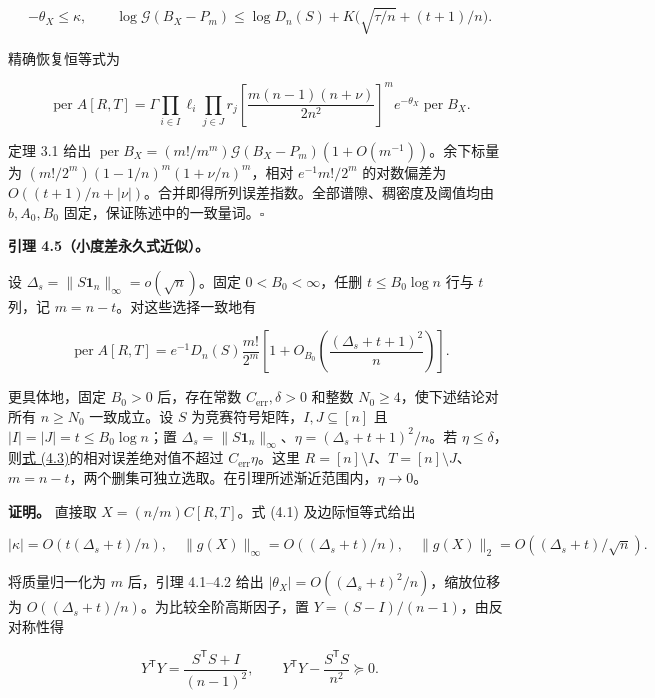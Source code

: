 \documentclass[11pt,a4paper]{article}
\begin{document}
\[
-\theta_X\le\kappa,\qquad
\log\mathcal G(B_X-P_m)\le\log D_n(S)+K\bigl(\sqrt{\tau/n}+(t+1)/n\bigr).
\]

精确恢复恒等式为

\begin{equation}
\operatorname{per}A[R,T]=\Gamma\prod_{i\in I}\ell_i\prod_{j\in J}r_j
\left[\frac{m(n-1)(n+\nu)}{2n^2}\right]^m
 e^{-\theta_X}\operatorname{per}B_X.\tag{4.2}
\label{eq-exact-restoration}
\end{equation}

定理 3.1 给出 \(\operatorname{per}B_X=(m!/m^m)\mathcal G(B_X-P_m)(1+O(m^{-1}))\)。余下标量为 \((m!/2^m)(1-1/n)^m(1+\nu/n)^m\)，相对 \(e^{-1}m!/2^m\) 的对数偏差为 \(O((t+1)/n+|\nu|)\)。合并即得所列误差指数。全部谱隙、稠密度及阈值均由 \(b,A_0,B_0\) 固定，保证陈述中的一致量词。\(\square\)

\textbf{引理 4.5（小度差永久式近似）。}

设 \(\Delta_s=\|S\mathbf 1_n\|_\infty=o(\sqrt n)\)。固定 \(0<B_0<\infty\)，任删 \(t\le B_0\log n\) 行与 \(t\) 列，记 \(m=n-t\)。对这些选择一致地有

\begin{equation}
\operatorname{per}A[R,T]=e^{-1}D_n(S)\frac{m!}{2^m}\left[1+O_{B_0}\left(\frac{(\Delta_s+t+1)^2}{n}\right)\right].
\tag{4.3}
\label{eq-small-score-permanent}
\end{equation}

更具体地，固定 \(B_0>0\) 后，存在常数 \(C_{\mathrm{err}},\delta>0\) 和整数 \(N_0\ge4\)，使下述结论对所有 \(n\ge N_0\) 一致成立。设 \(S\) 为竞赛符号矩阵，\(I,J\subseteq[n]\) 且 \(|I|=|J|=t\le B_0\log n\)；置 \(\Delta_s=\|S\mathbf1_n\|_\infty\)、\(\eta=(\Delta_s+t+1)^2/n\)。若 \(\eta\le\delta\)，则\hyperref[eq-small-score-permanent]{式 (4.3)}的相对误差绝对值不超过 \(C_{\mathrm{err}}\eta\)。这里 \(R=[n]\setminus I\)、\(T=[n]\setminus J\)、\(m=n-t\)，两个删集可独立选取。在引理所述渐近范围内，\(\eta\to0\)。

\textbf{证明。} 直接取 \(X=(n/m)C[R,T]\)。式 (4.1) 及边际恒等式给出

\[
|\kappa|=O(t(\Delta_s+t)/n),\quad
\|g(X)\|_\infty=O((\Delta_s+t)/n),\quad
\|g(X)\|_2=O((\Delta_s+t)/\sqrt n).
\]

将质量归一化为 \(m\) 后，引理 4.1--4.2 给出 \(|\theta_X|=O((\Delta_s+t)^2/n)\)，缩放位移为 \(O((\Delta_s+t)/n)\)。为比较全阶高斯因子，置 \(Y=(S-I)/(n-1)\)，由反对称性得

\[
Y^{\mathsf T}Y=\frac{S^{\mathsf T}S+I}{(n-1)^2},\qquad
Y^{\mathsf T}Y-\frac{S^{\mathsf T}S}{n^2}\succeq0.
\]
\end{document}

